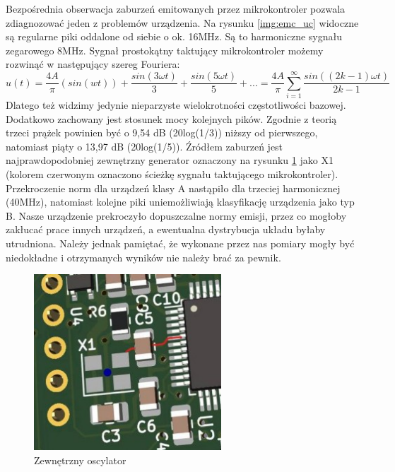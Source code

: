 Bezpośrednia obserwacja zaburzeń emitowanych przez mikrokontroler pozwala zdiagnozować jeden z problemów urządzenia. Na rysunku \ref{img:emc_uc} widoczne są regularne piki oddalone od siebie o ok. 16MHz. Są to harmoniczne sygnału zegarowego 8MHz.
\newline
Sygnał prostokątny taktujący mikrokontroler możemy rozwinąć w następujący szereg Fouriera: 
\begin{equation}
    u(t) = \frac{4A}{\pi} (sin(wt)) + \frac{sin(3\omega t)}{3} + \frac{sin(5\omega t)}{5} + ... = \frac{4A}{\pi} \sum \limits_{i=1}^{\infty} \frac{sin((2k - 1)\omega t)}{2k - 1}
\end{equation}
Dlatego też widzimy jedynie nieparzyste wielokrotności częstotliwości bazowej. Dodatkowo zachowany jest stosunek mocy kolejnych pików. Zgodnie z teorią trzeci prążek powinien być o 9,54 dB (20log(1/3)) niższy od pierwszego, natomiast piąty o 13,97 dB (20log(1/5)).
\newline
Źródłem zaburzeń jest najprawdopodobniej zewnętrzny generator oznaczony na rysunku \ref{img:emc_clock} jako X1 (kolorem czerwonym oznaczono ścieżkę sygnału taktującego mikrokontroler).
\newline
Przekroczenie norm dla urządzeń klasy A nastąpiło dla trzeciej harmonicznej (40MHz), natomiast kolejne piki uniemożliwiają klasyfikację urządzenia jako typ B. Nasze urządzenie prekroczyło dopuszczalne normy emisji, przez co mogłoby zakłucać prace innych urządzeń, a ewentualna dystrybucja układu byłaby utrudniona. Należy jednak pamiętać, że wykonane
przez nas pomiary mogły być niedokładne i otrzymanych wyników nie należy brać za pewnik. 

\begin{figure}[H]
    \centering
    \includegraphics[width=7cm]{Graphics/emc_clock.jpg}
    \caption{Zewnętrzny oscylator}
    \label{img:emc_clock}
\end{figure}

